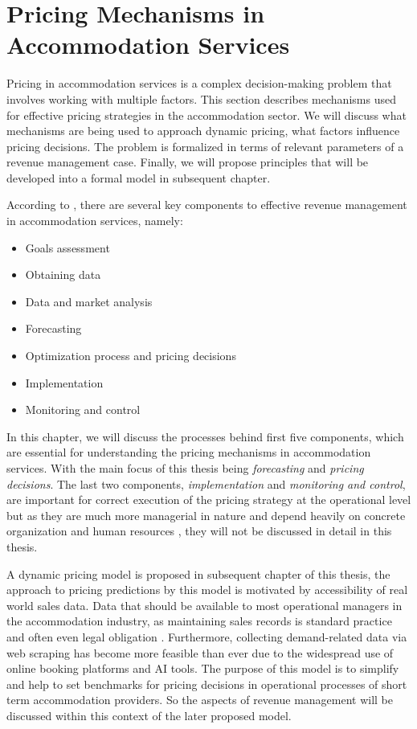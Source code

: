 \chapter{Pricing Mechanisms in Accommodation Services}
Pricing in accommodation services is a complex decision-making problem that involves working with multiple factors. This section describes mechanisms used for effective pricing strategies in the accommodation sector. We will discuss what mechanisms are being used to approach dynamic pricing, what factors influence pricing decisions. The problem is formalized in terms of relevant parameters of a revenue management case. Finally, we will propose principles that will be developed into a formal model in subsequent chapter.

According to \cite{Ivanov2014}, there are several key components to effective revenue management in accommodation services, namely:
\begin{itemize}
    \item Goals assessment
    \item Obtaining data
    \item Data and market analysis
    \item Forecasting
    \item Optimization process and pricing decisions
    \item Implementation
    \item Monitoring and control
\end{itemize}
In this chapter, we will discuss the processes behind first five components, which are essential for understanding the pricing mechanisms in accommodation services. With the main focus of this thesis being \textit{forecasting} and \textit{pricing decisions}. The last two components, \textit{implementation} and \textit{monitoring and control}, are important for correct execution of the pricing strategy at the operational level but as they are much more managerial in nature and depend heavily on concrete organization and human resources \cite{Petricek2021}, they will not be discussed in detail in this thesis.

A dynamic pricing model is proposed in subsequent chapter of this thesis, the approach to pricing predictions by this model is motivated by accessibility of real world sales data. Data that should be available to most operational managers in the accommodation industry, as maintaining sales records is standard practice and often even legal obligation \cite{Ivanov2014}. Furthermore, collecting demand-related data via web scraping has become more feasible than ever due to the widespread use of online booking platforms and AI tools. The purpose of this model is to simplify and help to set benchmarks for pricing decisions in operational processes of short term accommodation providers. So the aspects of revenue management will be discussed within this context of the later proposed model.


